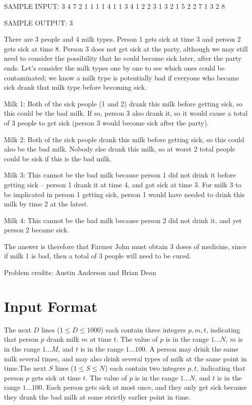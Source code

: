 \documentclass[12pt]{article}
\begin{document}
SAMPLE INPUT:
3 4 7 2
1 1 1
1 4 1
1 3 4
1 2 2
3 1 3
2 1 5
2 2 7
1 3
2 8

SAMPLE OUTPUT: 
3

There are 3 people and 4 milk types.  Person 1 gets sick at time 3
and person 2 gets sick at time 8.  Person 3 does not get sick at the
party, although we may still need to consider the possibility that
he could become sick later, after the party ends.  Let's consider
the milk types one by one to see which ones could be contaminated; we
know a milk type is potentially bad if everyone who became sick drank
that milk type before becoming sick.

Milk 1: Both of the sick people (1 and 2) drank this milk before
getting sick, so this could be the bad milk.  If so, person 3 also
drank it, so it would cause a total of 3 people to get sick (person 3
would become sick after the party).

Milk 2: Both of the sick people drank this milk before getting
sick, so this could also be the bad milk.  Nobody else drank this
milk, so at worst 2 total people could be sick if this is the bad
milk.

Milk 3: This cannot be the bad milk because person 1 did not drink
it before getting sick -- person 1 drank it at time 4, and got sick at
time 3.  For milk 3 to be implicated in person 1 getting sick, person
1 would have needed to drink this milk by time 2 at the latest.

Milk 4: This cannot be the bad milk because person 2 did not drink
it, and yet person 2 became sick.

The answer is therefore that Farmer John must obtain 3 doses of
medicine, since if milk 1 is bad, then a total of 3 people will need
to be cured.

Problem credits: Austin Anderson and Brian Dean



\section*{Input Format}
The next $D$ lines ($1 \leq D \leq 1000$) each contain three
integers $p, m, t$, indicating that person $p$ drank milk $m$ at time
$t$. The value of $p$ is in the range $1 \ldots N$, $m$ is in the
range $1 \ldots M$, and $t$ is in the range $1 \ldots 100$.  A person
may drink the same milk several times, and may also drink several
types of milk at the same point in time.The next $S$ lines ($1 \leq S \leq N$) each contain two integers
$p, t$, indicating that person $p$ gets sick at time $t$. The value of
$p$ is in the range $1 \ldots N$, and $t$ is in the range $1 \ldots
100$.  Each person gets sick at most once, and they only get sick
because they drank the bad milk at some strictly earlier point in
time.
\end{document}
